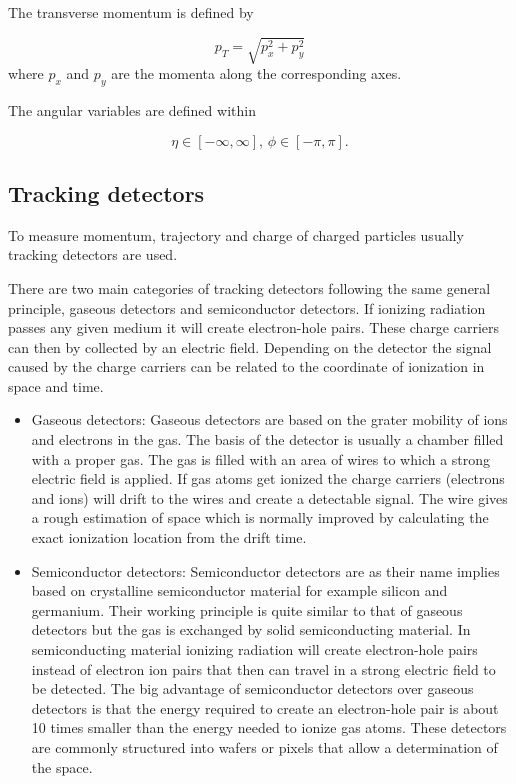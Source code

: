 The transverse momentum is defined by

\begin{equation}
p_T = \sqrt{p_x^2 + p_y^2}
\end{equation}
where $p_x$ and $p_y$ are the momenta along the corresponding axes. 

The angular variables are defined within

\begin{equation}
\eta \in [-\infty,\infty],\,
\phi \in [-\pi,\pi].
\end{equation}
\subsection{Tracking detectors}

To measure momentum, trajectory and charge of charged particles usually tracking detectors are used.

There are two main categories of tracking detectors following the same general principle, gaseous detectors and semiconductor detectors. If ionizing radiation passes any given medium it will create electron-hole pairs. These charge carriers can then by collected by an electric field. Depending on the detector the signal caused by the charge carriers can be related to the coordinate of ionization in space and time.

\begin{itemize}
\item Gaseous detectors: Gaseous detectors are based on the grater mobility of ions and electrons in the gas. The basis of the detector is usually a chamber filled with a proper gas. The gas is filled with an area of wires to which a strong electric field is applied. If gas atoms get ionized the charge carriers (electrons and ions) will drift to the wires and create a detectable signal. The wire gives a rough estimation of space which is normally improved by calculating the exact ionization location from the drift time.

\item Semiconductor detectors: Semiconductor detectors are as their name implies based on crystalline semiconductor material for example silicon and germanium. Their working principle is quite similar to that of gaseous detectors but the gas is exchanged by solid semiconducting material. In semiconducting material ionizing radiation will create electron-hole pairs instead of electron ion pairs that then can travel in a strong electric field to be detected. The big advantage of semiconductor detectors over gaseous detectors is that the energy required to create an electron-hole pair is about 10 times smaller than the energy needed to ionize gas atoms. These detectors are commonly structured into wafers or pixels that allow a determination of the space.
\end{itemize}

